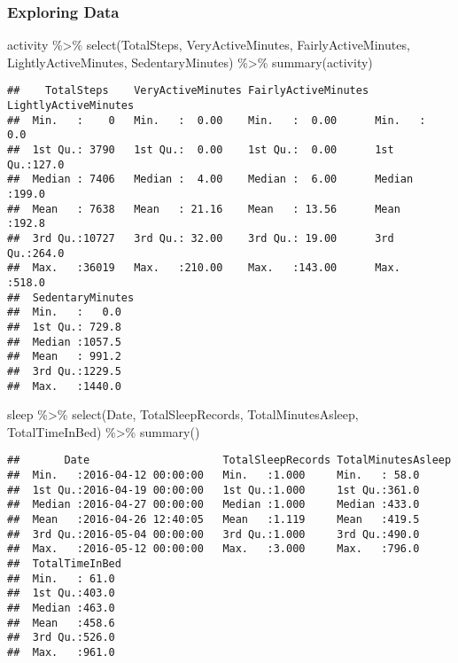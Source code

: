 \documentclass[
]{article}
\newenvironment{Shaded}{\begin{snugshade}}{\end{snugshade}}
\newcommand{\FunctionTok}[1]{\textcolor[rgb]{0.00,0.00,0.00}{#1}}
\newcommand{\NormalTok}[1]{#1}
\newcommand{\SpecialCharTok}[1]{\textcolor[rgb]{0.00,0.00,0.00}{#1}}
\begin{document}
\hypertarget{exploring-data}{%
\subsubsection{Exploring Data}\label{exploring-data}}

\begin{Shaded}
\begin{Highlighting}[]
\NormalTok{activity }\SpecialCharTok{\%\textgreater{}\%} 
  \FunctionTok{select}\NormalTok{(TotalSteps, VeryActiveMinutes, FairlyActiveMinutes, }
\NormalTok{         LightlyActiveMinutes, SedentaryMinutes) }\SpecialCharTok{\%\textgreater{}\%} 
  \FunctionTok{summary}\NormalTok{(activity)}
\end{Highlighting}
\end{Shaded}

\begin{verbatim}
##    TotalSteps    VeryActiveMinutes FairlyActiveMinutes LightlyActiveMinutes
##  Min.   :    0   Min.   :  0.00    Min.   :  0.00      Min.   :  0.0       
##  1st Qu.: 3790   1st Qu.:  0.00    1st Qu.:  0.00      1st Qu.:127.0       
##  Median : 7406   Median :  4.00    Median :  6.00      Median :199.0       
##  Mean   : 7638   Mean   : 21.16    Mean   : 13.56      Mean   :192.8       
##  3rd Qu.:10727   3rd Qu.: 32.00    3rd Qu.: 19.00      3rd Qu.:264.0       
##  Max.   :36019   Max.   :210.00    Max.   :143.00      Max.   :518.0       
##  SedentaryMinutes
##  Min.   :   0.0  
##  1st Qu.: 729.8  
##  Median :1057.5  
##  Mean   : 991.2  
##  3rd Qu.:1229.5  
##  Max.   :1440.0
\end{verbatim}

\begin{Shaded}
\begin{Highlighting}[]
\NormalTok{sleep }\SpecialCharTok{\%\textgreater{}\%} 
  \FunctionTok{select}\NormalTok{(Date, TotalSleepRecords, TotalMinutesAsleep, TotalTimeInBed) }\SpecialCharTok{\%\textgreater{}\%} 
  \FunctionTok{summary}\NormalTok{()}
\end{Highlighting}
\end{Shaded}

\begin{verbatim}
##       Date                     TotalSleepRecords TotalMinutesAsleep
##  Min.   :2016-04-12 00:00:00   Min.   :1.000     Min.   : 58.0     
##  1st Qu.:2016-04-19 00:00:00   1st Qu.:1.000     1st Qu.:361.0     
##  Median :2016-04-27 00:00:00   Median :1.000     Median :433.0     
##  Mean   :2016-04-26 12:40:05   Mean   :1.119     Mean   :419.5     
##  3rd Qu.:2016-05-04 00:00:00   3rd Qu.:1.000     3rd Qu.:490.0     
##  Max.   :2016-05-12 00:00:00   Max.   :3.000     Max.   :796.0     
##  TotalTimeInBed 
##  Min.   : 61.0  
##  1st Qu.:403.0  
##  Median :463.0  
##  Mean   :458.6  
##  3rd Qu.:526.0  
##  Max.   :961.0
\end{verbatim}
\end{document}
